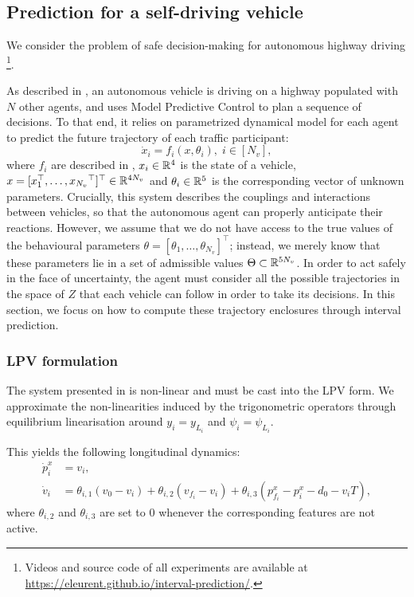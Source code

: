 \subsection{Prediction for a self-driving vehicle}
\label{sec:interval-prediction-experiments}
We consider the problem of safe decision-making for autonomous highway driving \citep{highway-env}\footnote{Videos and source code of all experiments are available at \href{https://eleurent.github.io/interval-prediction/}{https://eleurent.github.io/interval-prediction/}.}.

As described in , an autonomous vehicle is driving on a highway populated with $N$ other agents, and uses Model Predictive Control to plan a sequence of decisions. To that end, it relies on parametrized dynamical model for each agent to predict the future trajectory of each traffic participant: $$\dot{x}_i=f_i(x,\theta_i),\;i\in[N_v],$$ where $f_i$ are described in , $x_i\in\mathbb{R}^4$ is the state of a vehicle, $x = [x_1^\top,\dots,{x_{N_v}}^\top]^\top\in\mathbb{R}^{4N_v}$ and $\theta_i\in\mathbb{R}^5$ is the corresponding vector of unknown parameters. Crucially, this system describes the couplings and interactions between vehicles, so that the autonomous agent can properly anticipate their reactions. 
However, we assume that we do not have access to the true values of the behavioural parameters $\theta=[\theta_1,\dots,\theta_{N_v}]^\top$; instead, we merely know that these parameters lie in a set of admissible values $\Theta\subset\mathbb{R}^{5N_v}$. In order to act safely in the face of uncertainty, the agent must consider all the possible trajectories in the space of $Z$ that each vehicle can follow in order to take its decisions. In this section, we focus on how to compute these trajectory enclosures through interval prediction.

\subsubsection{\gls{LPV} formulation}

The system presented in  is non-linear and must be cast into the \gls{LPV} form. We approximate the non-linearities induced by the trigonometric operators through equilibrium linearisation around $y_i=y_{L_i}$ and $\psi_i=\psi_{L_i}$.

This yields the following longitudinal dynamics:
\begin{align*}
\dot{p}^x_i &= v_i,\\
\dot v_i &= \theta_{i,1} (v_0 - v_i) + \theta_{i,2} (v_{f_i} - v_i) + \theta_{i,3}(p^x_{f_i} - p^x_i - d_0 - v_i T),
\end{align*}
where $\theta_{i,2}$ and $\theta_{i,3}$ are set to $0$ whenever the corresponding features are not active.

